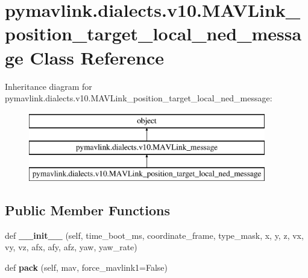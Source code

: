 \hypertarget{classpymavlink_1_1dialects_1_1v10_1_1MAVLink__position__target__local__ned__message}{}\section{pymavlink.\+dialects.\+v10.\+M\+A\+V\+Link\+\_\+position\+\_\+target\+\_\+local\+\_\+ned\+\_\+message Class Reference}
\label{classpymavlink_1_1dialects_1_1v10_1_1MAVLink__position__target__local__ned__message}
Inheritance diagram for pymavlink.\+dialects.\+v10.\+M\+A\+V\+Link\+\_\+position\+\_\+target\+\_\+local\+\_\+ned\+\_\+message\+:\begin{figure}[H]
\begin{center}
\leavevmode
\includegraphics[height=3.000000cm]{classpymavlink_1_1dialects_1_1v10_1_1MAVLink__position__target__local__ned__message}
\end{center}
\end{figure}
\subsection*{Public Member Functions}
\begin{DoxyCompactItemize}
\item 
\mbox{\label{classpymavlink_1_1dialects_1_1v10_1_1MAVLink__position__target__local__ned__message_a19533ca3797336c84dcccebe160bd2f3}} 
def {\bfseries \+\_\+\+\_\+init\+\_\+\+\_\+} (self, time\+\_\+boot\+\_\+ms, coordinate\+\_\+frame, type\+\_\+mask, x, y, z, vx, vy, vz, afx, afy, afz, yaw, yaw\+\_\+rate)
\item 
\mbox{\label{classpymavlink_1_1dialects_1_1v10_1_1MAVLink__position__target__local__ned__message_a93da78772219716e2bb5401aad35de10}} 
def {\bfseries pack} (self, mav, force\+\_\+mavlink1=False)
\end{DoxyCompactItemize}
